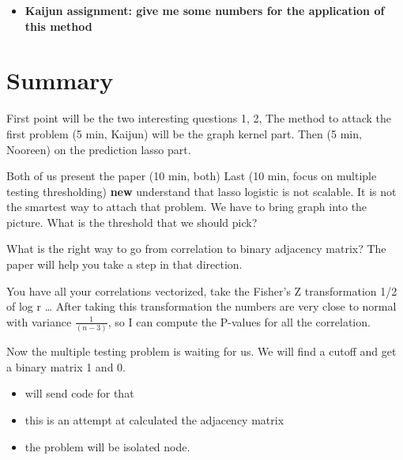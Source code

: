 \documentclass[11pt]{article}
\begin{document}
\begin{itemize}
\item \textbf{Kaijun assignment: give me some numbers for the application of this method}
\end{itemize}

\section{Summary}
\label{sec-5}
First point will be the two interesting questions 1, 2, 
The method to attack the first problem (5 min, Kaijun) will be the graph kernel part.
Then (5 min, Nooreen) on the prediction lasso part.

Both of us present the paper (10 min, both)
Last (10 min, focus on multiple testing thresholding) \textbf{new} understand that lasso logistic is not scalable. It
is not the smartest way to attach that problem. We have to bring graph 
into the picture. What is the threshold that we should pick?

 What is the right way to go from correlation to binary adjacency 
matrix? The paper will help you take a step in that direction.

 You have all your correlations vectorized, take the Fisher's Z transformation
 1/2 of log r \ldots{} After taking this transformation the numbers are very close
to normal with variance $\frac{1}{(n-3)}$, so I can compute the P-values for 
all the correlation. 

Now the multiple testing problem is waiting for us. We will find a cutoff and get
a binary matrix 1 and 0.
\begin{itemize}
\item will send code for that
\item this is an attempt at calculated the adjacency matrix

\item the problem will be isolated node.
\end{itemize}
\end{document}
